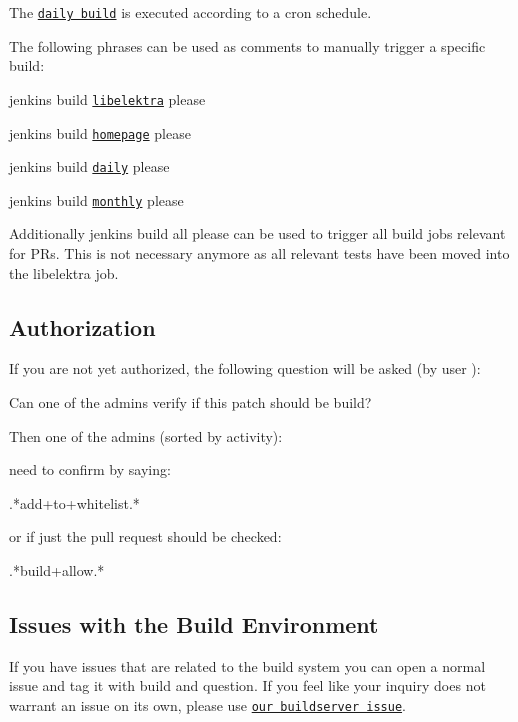 The \href{https://build.libelektra.org/jenkins/job/libelektra-daily/}{\tt daily build} is executed according to a cron schedule.

The following phrases can be used as comments to manually trigger a specific build\+:


\begin{DoxyItemize}
\item jenkins build \href{https://build.libelektra.org/jenkins/job/libelektra/}{\tt libelektra} please
\item jenkins build \href{https://build.libelektra.org/job/elektra-homepage/}{\tt homepage} please
\item jenkins build \href{https://build.libelektra.org/jenkins/job/libelektra-daily/}{\tt daily} please
\item jenkins build \href{https://build.libelektra.org/jenkins/job/libelektra-monthly/}{\tt monthly} please
\end{DoxyItemize}

Additionally {\ttfamily jenkins build all please} can be used to trigger all build jobs relevant for PR\textquotesingle{}s. This is not necessary anymore as all relevant tests have been moved into the libelektra job.

\subsection*{Authorization}

If you are not yet authorized, the following question will be asked (by user )\+: \begin{DoxyVerb}Can one of the admins verify if this patch should be build?
\end{DoxyVerb}


Then one of the admins (sorted by activity)\+:


\begin{DoxyItemize}
\item 
\item 
\item 
\item 
\item 
\item 
\end{DoxyItemize}

need to confirm by saying\+: \begin{DoxyVerb}.*add\W+to\W+whitelist.*
\end{DoxyVerb}


or if just the pull request should be checked\+: \begin{DoxyVerb}.*build\W+allow.*
\end{DoxyVerb}


\subsection*{Issues with the Build Environment}

If you have issues that are related to the build system you can open a normal issue and tag it with {\ttfamily build} and {\ttfamily question}. If you feel like your inquiry does not warrant an issue on its own, please use \href{https://issues.libelektra.org/160}{\tt our buildserver issue}. 